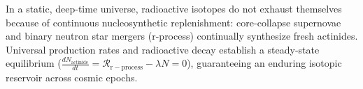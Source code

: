 \begin{enumerate}
          In a static, deep-time universe, radioactive isotopes do not exhaust themselves because of continuous nucleosynthetic replenishment: core-collapse supernovae and binary neutron star mergers (r-process) continually synthesize fresh actinides. Universal production rates and radioactive decay establish a steady-state equilibrium ($\frac{dN_{\mathrm{actinide}}}{dt} = \mathcal{R}_{\mathrm{r-process}} - \lambda N = 0$), guaranteeing an enduring isotopic reservoir across cosmic epochs.
\end{enumerate}
